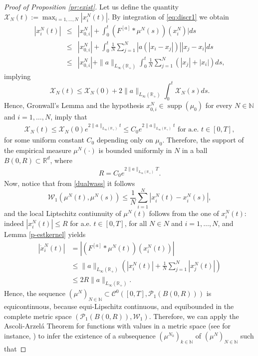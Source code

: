 \documentclass[A4paper,11pt]{article}
\theoremstyle{definition}
\newcommand{\N}{\mathbb{N}}
\newcommand{\R}{\mathbb{R}}
\newcommand{\W}{\mathcal{W}}
\DeclareMathOperator{\supp}{supp}
\newcommand{\Fun}[1]{F^{[#1]}}
\begin{document}
\begin{proof}[Proof of Proposition \ref{pr:exist}]



Let us define the quantity $\mathcal X_N(t) := \max_{i=1,\dots,N} |x_i^N(t)|$. By integration of \eqref{eq:discr1} we obtain
\begin{eqnarray*}
 |x_i^N(t)| &\leq& |x^N_{0,i}| + \int_0^t (\Fun{a} * \mu^N(s))(x_i^N)| ds \\
&\leq&  |x^N_{0,i}| + \int_0^t\frac{1}{N} \sum_{j=1}^N |a(|x_i-x_j|)||x_j-x_i| ds \\
&\leq&  |x^N_{0,i}| + \|a\|_{L_{\infty}(\R_+)} \int_0^t\frac{1}{N} \sum_{j=1}^N( |x_j| + | x_i| )ds,
\end{eqnarray*}
implying
$$
\mathcal X_N(t) \leq \mathcal X_N(0) + 2  \|a\|_{L_{\infty}(\R_+)} \int_0^t \mathcal X_N(s) ds. 
$$
Hence, Gronwall's Lemma and the hypothesis $x^{N}_{0,i} \in \supp(\mu_0)$ for every $N \in \N$ and $i = 1, \ldots, N$, imply that
\begin{align*}
\mathcal X_N(t) \leq \mathcal X_N(0) e^{2 \|a\|_{L_{\infty}(\R_+)} t} \leq C_0 e^{2 \|a\|_{L_{\infty}(\R_+)} t} \text{ for a.e. } t \in [0,T],
\end{align*}
for some uniform constant $C_0$ depending only on $\mu_0$. Therefore, the support of the empirical measure $\mu^N(\cdot)$ is bounded uniformly in $N$ in a ball $B(0,R) \subset \R^d$, where
\begin{align}\label{Rest}
R =  C_0 e^{2 \|a\|_{L_{\infty}(\R_+)} T}.
\end{align}
Now, notice that from \eqref{dualwass} it follows
$$
\mathcal W_1(\mu^N(t), \mu^N(s)) \leq \frac{1}{N} \sum_{i=1}^N | x_i^N(t) - x_i^N(s)| ,
$$
and the local Liptschitz contiunuity of $\mu^N(t)$ follows from the one of $x_i^N(t)$: indeed  $|x^N_i(t)| \leq R$ for a.e. $t \in [0,T]$, for all $N \in N$ and $i = 1, \ldots, N$, and Lemma \ref{p-estkernel} yields
\begin{align*}
|\dot{x}^N_i(t)| &= |(\Fun{a}*\mu^N(t))(x^N_i(t))| \\
&\leq \|a\|_{L_{\infty}(\R_+)} \left( |x^N_i(t)| + \frac{1}{N}\sum^N_{j = 1}|x^N_j(t)|\right) \\
&\leq 2R\|a\|_{L_{\infty}(\R_+)}.
\end{align*}
Hence, the sequence $(\mu^N)_{N \in \N} \subset \mathcal{C}^0([0,T],\mathcal{P}_1(B(0,R)))$ is equicontinuous, because equi-Lipschitz continuous, and equibounded in the complete metric space $(\mathcal{P}_1(B(0,R)),\W_1)$.
Therefore, we can apply the Ascoli-Arzel\'{a} Theorem for functions with values in a metric space (see for instance, \cite[Chapter 7, Theorem 18]{KelleyTop}) to infer the existence of a subsequence $(\mu^{N_k})_{k \in \N}$ of $(\mu^N)_{N \in \N}$ such that

\end{proof}
\end{document}
